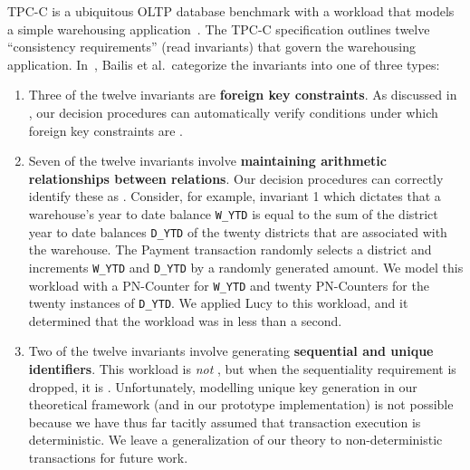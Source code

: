 \example[TPC-C]
TPC-C is a ubiquitous OLTP database benchmark with a workload that models a
simple warehousing application~\cite{difallah2013oltp}. The TPC-C specification
outlines twelve ``consistency requirements'' (read invariants) that govern the
warehousing application. In~\cite{bailis2014coordination}, Bailis et al.\
categorize the invariants into one of three types:
\begin{enumerate}
  \item
    Three of the twelve invariants are \textbf{foreign key constraints}.  As
    discussed in \exampleref{ForeignKeysEval}, our decision procedures can
    automatically verify conditions under which foreign key constraints are
    \invariantconfluent{}.

  \item
    \newcommand{\ttt}[1]{{\smaller \texttt{#1}}} Seven of the twelve invariants
    involve \textbf{maintaining arithmetic relationships between relations}.
    Our decision procedures can correctly identify these as
    \invariantconfluent{}. Consider, for example, invariant 1 which dictates
    that a warehouse's year to date balance \ttt{W\_YTD} is equal to the sum of
    the district year to date balances \ttt{D\_YTD} of the twenty districts
    that are associated with the warehouse. The Payment transaction randomly
    selects a district and increments \ttt{W\_YTD} and \ttt{D\_YTD} by a
    randomly generated amount. We model this workload with a PN-Counter for
    \ttt{W\_YTD} and twenty PN-Counters for the twenty instances of
    \ttt{D\_YTD}. We applied Lucy to this workload, and it determined that the
    workload was \invariantconfluent{} in less than a second.

  \item
    Two of the twelve invariants involve generating \textbf{sequential and
    unique identifiers}. This workload is \emph{not} \invariantconfluent{}, but
    when the sequentiality requirement is dropped, it is \invariantconfluent{}.
    Unfortunately, modelling unique key generation in our theoretical framework
    (and in our prototype implementation) is not possible because we have thus
    far tacitly assumed that transaction execution is deterministic. We leave a
    generalization of our theory to non-deterministic transactions for future
    work.
\end{enumerate}

